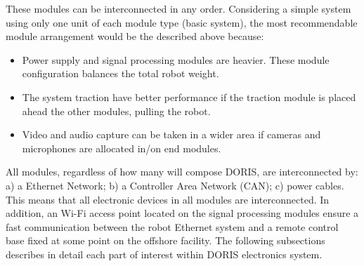 These modules can be interconnected in any order. Considering a simple system using only one unit of each module type (basic system), the most recommendable module arrangement would be the described above because:
\begin{itemize}
  \item Power supply and signal processing modules are heavier. These module configuration balances the total robot weight.
  \item The system traction have better performance if the traction module is placed ahead the other modules, pulling the robot.
  \item Video and audio capture can be taken in a wider area if cameras and microphones are allocated in/on end modules.
\end{itemize}
All modules, regardless of how many will compose DORIS, are interconnected by: a) a Ethernet Network; b) a Controller Area Network (CAN); c) power cables. This means that all electronic devices in all modules are interconnected. In addition, an Wi-Fi access point located on the signal processing modules ensure a fast communication between the robot Ethernet system and a remote control base fixed at some point on the offshore facility.
\newline
The following subsections describes in detail each part of interest within DORIS electronics system.

